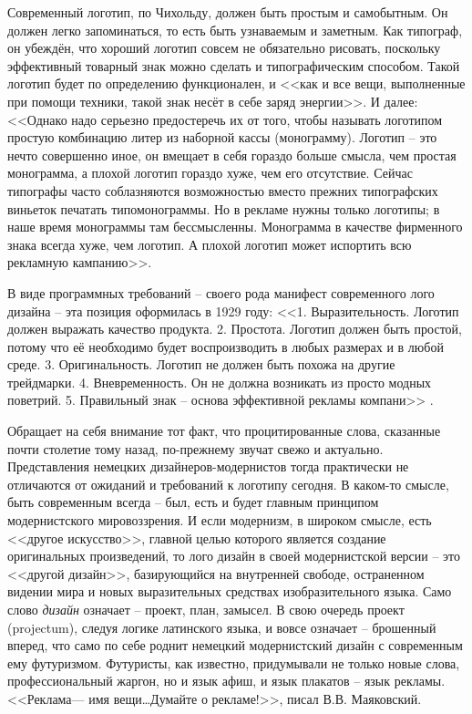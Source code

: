Современный логотип, по Чихольду, должен быть простым и самобытным. Он должен легко запоминаться, то
есть быть узнаваемым и заметным. Как типограф, он убеждён, что хороший логотип совсем не обязательно
рисовать, поскольку эффективный товарный знак можно сделать и типографическим способом. Такой
логотип будет по определению функционален, и <<как и все вещи, выполненные при помощи техники, такой
знак несёт в себе заряд энергии>>\autocite[][118]{chihold2011}. И далее: <<Однако надо серьезно
предостеречь их от того, чтобы называть логотипом простую комбинацию литер из наборной кассы
(монограмму). Логотип -- это нечто совершенно иное, он вмещает в себя гораздо больше смысла, чем
простая монограмма, а плохой логотип гораздо хуже, чем его отсутствие. Сейчас типографы часто
соблазняются возможностью вместо прежних типографских виньеток печатать типомонограммы. Но в рекламе
нужны только логотипы; в наше время монограммы там бессмысленны. Монограмма в качестве фирменного
знака всегда хуже, чем логотип. А плохой логотип может испортить всю рекламную кампанию>>.
\autocite[][119]{chihold2011}

В виде программных требований -- своего рода манифест современного лого дизайна -- эта позиция
оформилась в 1929 году: <<1. Выразительность. Логотип должен выражать качество
продукта. 2. Простота. Логотип должен быть простой, потому что её необходимо будет воспроизводить в
любых размерах и в любой среде. 3. Оригинальность. Логотип не должен быть похожа на другие
трейдмарки. 4. Вневременность. Он не должна возникать из просто модных поветрий. 5. Правильный знак
– основа эффективной рекламы компани>> \autocite{cabarga1982treasury}.

Обращает на себя внимание тот факт, что процитированные слова, сказанные почти столетие тому назад,
по-прежнему звучат свежо и актуально. Представления немецких дизайнеров-модернистов тогда
практически не отличаются от ожиданий и требований к логотипу сегодня. В каком-то смысле, быть
современным всегда -- был, есть и будет главным принципом модернистского мировоззрения. И если
модернизм, в широком смысле, есть <<другое искусство>>, главной целью которого является создание
оригинальных произведений, то лого дизайн в своей модернистской версии -- это <<другой дизайн>>,
базирующийся на внутренней свободе, остраненном видении мира и новых выразительных средствах
изобразительного языка. Само слово \emph{дизайн} означает -- проект, план, замысел. В свою очередь
проект (projectum), следуя логике латинского языка, и вовсе означает -- брошенный вперед\autocite[][323]{serov2005}, что само
по себе роднит немецкий модернистский дизайн с современным ему футуризмом. Футуристы, как известно,
придумывали не только новые слова, профессиональный жаргон, но и язык афиш, и язык плакатов -- язык
рекламы. <<Реклама--– имя вещи\ldots Думайте о рекламе!>>, писал
В.В. Маяковский\autocite{mayakovsky1959}.

